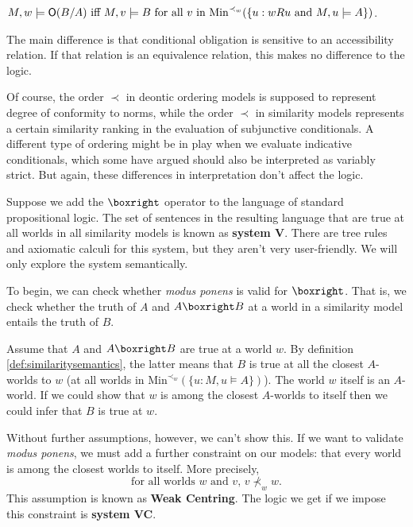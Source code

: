 \medskip
\quad$M,w \models \Ob (B/A) \text{ iff } M,v \models B\text{ for all $v$ in $\mathrm{Min}^{\prec_w}(\{ u: wRu $ and $M,u\models A \})$}$.

\medskip \noindent%
The main difference is that conditional obligation is sensitive to an
accessibility relation. If that relation is an equivalence relation, this makes
no difference to the logic.


Of course, the order $\prec$ in deontic ordering models is supposed to represent
degree of conformity to norms, while the order $\prec$ in similarity models
represents a certain similarity ranking in the evaluation of subjunctive
conditionals. A different type of ordering might be in play when we evaluate
indicative conditionals, which some have argued should also be interpreted as
variably strict. But again, these differences in interpretation don't affect the
logic.

Suppose we add the $\boxright$ operator to the language of standard
propositional logic. The set of sentences in the resulting language that are
true at all worlds in all similarity models is known as \textbf{system V}. There
are tree rules and axiomatic calculi for this system, but they aren't very
user-friendly. We will only explore the system semantically.

To begin, we can check whether \emph{modus ponens} is valid for $\boxright$. That is,
we check whether the truth of $A$ and $A \boxright B$ at a world in a
similarity model entails the truth of $B$.

Assume that $A$ and $A \boxright B$ are true at a world $w$. By definition
\ref{def:similaritysemantics}, the latter means that $B$ is true at all the
closest $A$-worlds to $w$ (at all worlds in
$\mathrm{Min}^{\prec_w}(\{u: M,u\models A\})$). The world $w$ itself is an
$A$-world. If we could show that $w$ is among the closest $A$-worlds to itself
then we could infer that $B$ is true at $w$.

Without further assumptions, however, we can't show this. If we want to validate
\emph{modus ponens}, we must add a further constraint on our models: that every
world is among the closest worlds to itself. More precisely,
\[
  \text{for all worlds $w$ and $v$, $v \nprec_{w} w$.}
\]
This assumption is known as \textbf{Weak Centring}.
The logic we get if we impose this constraint is \textbf{system VC}.

